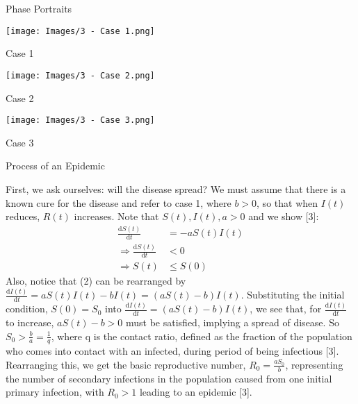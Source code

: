 \documentclass[final]{beamer}
\newlength{\colwidth}
\begin{document}
\begin{frame}[t]
\begin{columns}[t]
\begin{column}{\colwidth}
\begin{block}{Phase Portraits}
    \begin{minipage}{330pt}
        \texttt{[image: Images/3 - Case 1.png]}
        \begin{center}
            \caption{\small Case 1}
        \end{center}
    \end{minipage}
    \begin{minipage}{330pt}
        \texttt{[image: Images/3 - Case 2.png]}
        \begin{center}
            \caption{\small Case 2}
        \end{center}
    \end{minipage}
    \begin{minipage}{330pt}
        \texttt{[image: Images/3 - Case 3.png]}
        \begin{center}
            \caption{\small Case 3}
        \end{center}
    \end{minipage}

    
  
  
  \end{block}

  \begin{block}{Process of an Epidemic}

  First, we ask ourselves: will the disease spread? We must assume that there is a known cure for the disease and refer to case 1, where $b > 0$, so that when $I(t)$ reduces, $R(t)$ increases. Note that $S(t), I(t), a > 0$ and we show [3]:
  \begin{align*}
  \frac{\mathrm{d}S(t)}{\mathrm{d}t} &= -aS(t)I(t)\\
  \Rightarrow \frac{\mathrm{d}S(t)}{\mathrm{d}t} &< 0\\
  \Rightarrow S(t) &\le S(0)
  \end{align*}
  Also, notice that (2) can be rearranged by $\frac{\textrm{d}I(t)}{\textrm{d}t} = aS(t)I(t) - bI(t) = (aS(t) - b)I(t)$. Substituting the initial condition, $S(0) = S_{0}$ into $\frac{\textrm{d}I(t)}{\textrm{d}t} = (aS(t) - b)I(t)$, we see that, for $\frac{\mathrm{d}I(t)}{\mathrm{d}t}$ to increase, $aS(t) - b > 0$ must be satisfied, implying a spread of disease. So $S_{0} > \frac{b}{a} = \frac{1}{q}$, where q is the contact ratio, defined as the fraction of the population who comes into contact with an infected, during period of being infectious [3]. Rearranging this, we get the basic reproductive number, $R_{0} = \frac{aS_{0}}{b}$, representing the number of secondary infections in the population caused from one initial primary infection, with $R_{0} > 1$ leading to an epidemic [3].


\end{block}
\end{column}
\end{columns}
\end{frame}
\end{document}
